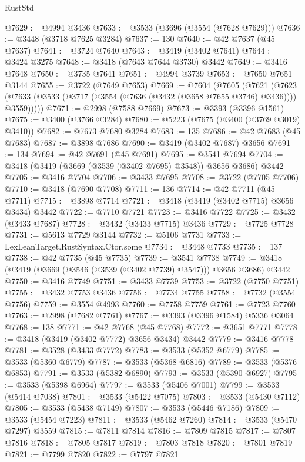 \begin{lexlean}{RustStd}
\begin{coremodule}
@7629 := @4994 @3436
@7633 := @3533 (@3696 (@3554 (@7628 @7629)))
@7636 := @3448 (@3718 @7625 @3284)
@7637 := 130
@7640 := @42 @7637 (@45 @7637)
@7641 := @3724 @7640
@7643 := @3419 (@3402 @7641)
@7644 := @3424 @3275
@7648 := @3418 (@7643 @7644 @3730) @3442
@7649 := @3416 @7648
@7650 := @3735 @7641
@7651 := @4994 @3739
@7653 := @7650 @7651 @3144
@7655 := @3722 (@7649 @7653)
@7669 := @7604
    (@7605
      (@7621
        (@7623 (@7633 (@3533 (@3717 (@3554 (@7636 (@3432 (@3658 @7655 @3746) @3436)))) @3559)))))
@7671 := @2998 (@7588 @7669)
@7673 := @3393 (@3396 @1561)
@7675 := @3400 (@3766 @3284)
@7680 := @5223 (@7675 (@3400 (@3769 @3019) @3410))
@7682 := @7673 @7680 @3284
@7683 := 135
@7686 := @42 @7683 (@45 @7683)
@7687 := @3898 @7686
@7690 := @3419 (@3402 @7687) @3656
@7691 := 134
@7694 := @42 @7691 (@45 @7691)
@7695 := @3541 @7694
@7704 := @3418 (@3419 (@3669 (@3539 (@3402 @7695) @3548)) @3656 @3686) @3442
@7705 := @3416 @7704
@7706 := @3433 @7695
@7708 := @3722 (@7705 @7706)
@7710 := @3418 (@7690 @7708)
@7711 := 136
@7714 := @42 @7711 (@45 @7711)
@7715 := @3898 @7714
@7721 := @3418 (@3419 (@3402 @7715) @3656 @3434) @3442
@7722 := @7710 @7721
@7723 := @3416 @7722
@7725 := @3432 (@3433 @7687)
@7728 := @3432 (@3433 @7715) @3436
@7729 := @7725 @7728
@7731 := @5613 @7729 @3144
@7732 := @5106 @7731
@7733 := LexLeanTarget.RustSyntax.Ctor.some
@7734 := @3448 @7733
@7735 := 137
@7738 := @42 @7735 (@45 @7735)
@7739 := @3541 @7738
@7749 := @3418 (@3419 (@3669 (@3546 (@3539 (@3402 @7739) @3547))) @3656 @3686) @3442
@7750 := @3416 @7749
@7751 := @3433 @7739
@7753 := @3722 (@7750 @7751)
@7755 := @3432 @7753 @3436
@7756 := @7734 @7755
@7758 := @7732 (@3554 @7756)
@7759 := @3554 @4993
@7760 := @7758 @7759
@7761 := @7723 @7760
@7763 := @2998 (@7682 @7761)
@7767 := @3393 (@3396 @1584) @5336 @3064
@7768 := 138
@7771 := @42 @7768 (@45 @7768)
@7772 := @3651 @7771
@7778 := @3418 (@3419 (@3402 @7772) @3656 @3434) @3442
@7779 := @3416 @7778
@7781 := @3528 (@3433 @7772)
@7783 := @3533 (@5352 @6779)
@7785 := @3533 (@5360 @6779)
@7787 := @3533 (@5368 @6816)
@7789 := @3533 (@5376 @6853)
@7791 := @3533 (@5382 @6890)
@7793 := @3533 (@5390 @6927)
@7795 := @3533 (@5398 @6964)
@7797 := @3533 (@5406 @7001)
@7799 := @3533 (@5414 @7038)
@7801 := @3533 (@5422 @7075)
@7803 := @3533 (@5430 @7112)
@7805 := @3533 (@5438 @7149)
@7807 := @3533 (@5446 @7186)
@7809 := @3533 (@5454 @7223)
@7811 := @3533 (@5462 @7260)
@7814 := @3533 (@5470 @7297) @3559
@7815 := @7811 @7814
@7816 := @7809 @7815
@7817 := @7807 @7816
@7818 := @7805 @7817
@7819 := @7803 @7818
@7820 := @7801 @7819
@7821 := @7799 @7820
@7822 := @7797 @7821

\end{coremodule}
\end{lexlean}

